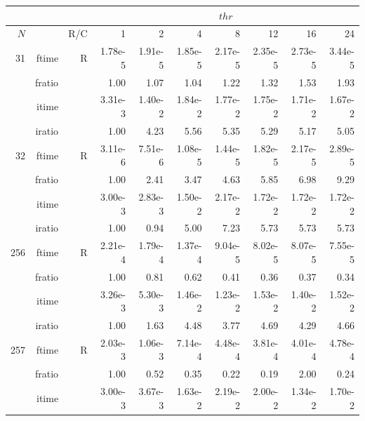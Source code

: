 \documentclass[a4paper]{article}
\begin{document}
\begin{table}
\begin{center}
\begin{tabular}{|r|r|r|r|r|r|r|r|r|r|}
\hline 
     \multicolumn{3}{|c|}{ } & \multicolumn{7}{c|}{$thr$} \\ \hline
    $N$  & & R/C  & 1           & 2    & 4    & 8    & 12   & 16    & 24  \\ \hline\hline
    31  & ftime & R  &  1.78e-5 &   1.91e-5 &   1.85e-5 &   2.17e-5 &   2.35e-5 &   2.73e-5 &   3.44e-5    \\ 
    & fratio & &      1.00 &   1.07 &   1.04 &   1.22 &   1.32 &   1.53 &   1.93      \\ 
     & itime & &        3.31e-3 &   1.40e-2 &   1.84e-2 &   1.77e-2 &   1.75e-2 &   1.71e-2 &   1.67e-2      \\ 
     & iratio & &       1.00 &   4.23 &   5.56 &   5.35 &   5.29 &   5.17 &   5.05       \\ \hline 
    32  & ftime & R  &  3.11e-6 &   7.51e-6 &   1.08e-5 &   1.44e-5 &   1.82e-5 &   2.17e-5 &   2.89e-5    \\ 
      & fratio & &      1.00 &   2.41 &   3.47 &   4.63 &   5.85 &   6.98 &   9.29      \\ 
     & itime & &        3.00e-3 &   2.83e-3 &   1.50e-2 &   2.17e-2 &   1.72e-2 &   1.72e-2 &   1.72e-2      \\ 
     & iratio & &       1.00 &   0.94 &   5.00 &   7.23 &   5.73 &   5.73 &   5.73      \\ \hline 
   256  & ftime & R  &  2.21e-4 &   1.79e-4 &   1.37e-4 &   9.04e-5 &   8.02e-5 &   8.07e-5 &   7.55e-5    \\ 
      & fratio & &      1.00 &   0.81 &   0.62 &   0.41 &   0.36 &   0.37 &   0.34      \\ 
     & itime & &        3.26e-3 &   5.30e-3 &   1.46e-2 &   1.23e-2 &   1.53e-2 &   1.40e-2 &   1.52e-2     \\ 
     & iratio & &       1.00 &   1.63 &   4.48 &   3.77 &   4.69 &   4.29 &   4.66      \\ \hline 
   257  & ftime & R  &  2.03e-3 &   1.06e-3 &   7.14e-4 &   4.48e-4 &   3.81e-4 &   4.01e-4 &   4.78e-4    \\ 
      & fratio & &      1.00 &   0.52 &   0.35 &   0.22 &   0.19 &   2.00 &   0.24      \\ 
     & itime & &        3.00e-3 &   3.67e-3 &   1.63e-2 &   2.19e-2 &   2.00e-2 &   1.34e-2 &   1.70e-2      \\ 

\end{tabular}
\end{center}
\end{table}
\end{document}

